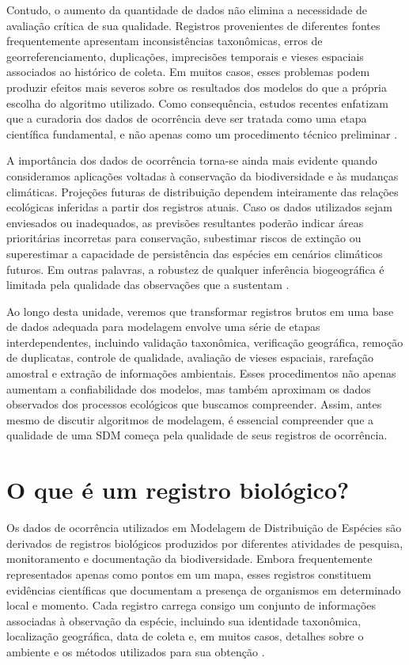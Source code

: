 Contudo, o aumento da quantidade de dados não elimina a necessidade de avaliação crítica de sua qualidade. Registros provenientes de diferentes fontes frequentemente apresentam inconsistências taxonômicas, erros de georreferenciamento, duplicações, imprecisões temporais e vieses espaciais associados ao histórico de coleta. Em muitos casos, esses problemas podem produzir efeitos mais severos sobre os resultados dos modelos do que a própria escolha do algoritmo utilizado. Como consequência, estudos recentes enfatizam que a curadoria dos dados de ocorrência deve ser tratada como uma etapa científica fundamental, e não apenas como um procedimento técnico preliminar \parencite{zurell2020standard,zizka2019coordinatecleaner}.

A importância dos dados de ocorrência torna-se ainda mais evidente quando consideramos aplicações voltadas à conservação da biodiversidade e às mudanças climáticas. Projeções futuras de distribuição dependem inteiramente das relações ecológicas inferidas a partir dos registros atuais. Caso os dados utilizados sejam enviesados ou inadequados, as previsões resultantes poderão indicar áreas prioritárias incorretas para conservação, subestimar riscos de extinção ou superestimar a capacidade de persistência das espécies em cenários climáticos futuros. Em outras palavras, a robustez de qualquer inferência biogeográfica é limitada pela qualidade das observações que a sustentam \parencite{araujo2019standards,franklin2010mapping}.

Ao longo desta unidade, veremos que transformar registros brutos em uma base de dados adequada para modelagem envolve uma série de etapas interdependentes, incluindo validação taxonômica, verificação geográfica, remoção de duplicatas, controle de qualidade, avaliação de vieses espaciais, rarefação amostral e extração de informações ambientais. Esses procedimentos não apenas aumentam a confiabilidade dos modelos, mas também aproximam os dados observados dos processos ecológicos que buscamos compreender. Assim, antes mesmo de discutir algoritmos de modelagem, é essencial compreender que a qualidade de uma SDM começa pela qualidade de seus registros de ocorrência.

\section{O que é um registro biológico?}

Os dados de ocorrência utilizados em Modelagem de Distribuição de Espécies são derivados de registros biológicos produzidos por diferentes atividades de pesquisa, monitoramento e documentação da biodiversidade. Embora frequentemente representados apenas como pontos em um mapa, esses registros constituem evidências científicas que documentam a presença de organismos em determinado local e momento. Cada registro carrega consigo um conjunto de informações associadas à observação da espécie, incluindo sua identidade taxonômica, localização geográfica, data de coleta e, em muitos casos, detalhes sobre o ambiente e os métodos utilizados para sua obtenção \parencite{franklin2010mapping,peterson2011ecological}.

